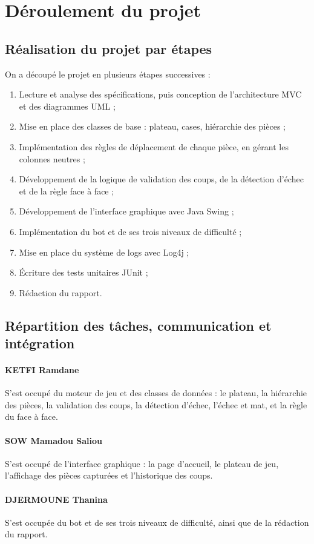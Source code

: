 \newpage
\section{Déroulement du projet}
\subsection{Réalisation du projet par étapes}
On a découpé le projet en plusieurs étapes successives :
\begin{enumerate}
\item Lecture et analyse des spécifications, puis conception de l'architecture MVC et des diagrammes UML ;
\item Mise en place des classes de base : plateau, cases, hiérarchie des pièces ;
\item Implémentation des règles de déplacement de chaque pièce, en gérant les colonnes neutres ;
\item Développement de la logique de validation des coups, de la détection d'échec et de la règle face à face ;
\item Développement de l'interface graphique avec Java Swing ;
\item Implémentation du bot et de ses trois niveaux de difficulté ;
\item Mise en place du système de logs avec Log4j ;
\item Écriture des tests unitaires JUnit ;
\item Rédaction du rapport.
\end{enumerate}
\subsection{Répartition des tâches, communication et intégration}
\paragraph{KETFI Ramdane}
S'est occupé du moteur de jeu et des classes de données : le plateau, la hiérarchie des pièces, la validation des coups, la détection d'échec, l'échec et mat, et la règle du face à face.
\paragraph{SOW Mamadou Saliou}
S'est occupé de l'interface graphique : la page d'accueil, le plateau de jeu, l'affichage des pièces capturées et l'historique des coups.
\paragraph{DJERMOUNE Thanina}
S'est occupée du bot et de ses trois niveaux de difficulté, ainsi que de la rédaction du rapport.
